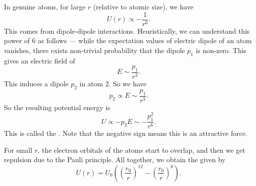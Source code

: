 \documentclass[a4paper]{article}
\begin{document}
\begin{eg}
  In genuine atoms, for large $r$ (relative to atomic size), we have
  \[
    U(r) \propto -\frac{1}{r^6}.
  \]
  This comes from dipole-dipole interactions. Heuristically, we can understand this power of $6$ as follows --- while the expectation values of electric dipole of an atom vanishes, there exists non-trivial probability that the dipole $p_1$ is non-zero. This gives an electric field of
  \[
    E \sim \frac{p_1}{r^3}.
  \]
  This induces a dipole $p_2$ in atom $2$. So we have
  \[
    p_2 \propto E \sim \frac{p_1}{r^3}.
  \]
  So the resulting potential energy is
  \[
    U \propto -p_2 E \sim -\frac{p_1^2}{r^6}.
  \]
  This is called the . Note that the negative sign means this is an attractive force.

  For small $r$, the electron orbitals of the atoms start to overlap, and then we get repulsion due to the Pauli principle. All together, we obtain the  given by
  \[
    U(r) = U_0\left(\left(\frac{r_0}{r}\right)^{12} - \left(\frac{r_0}{r}\right)^6\right).
  \]
  \begin{center}
\end{center}
\end{eg}
\end{document}
